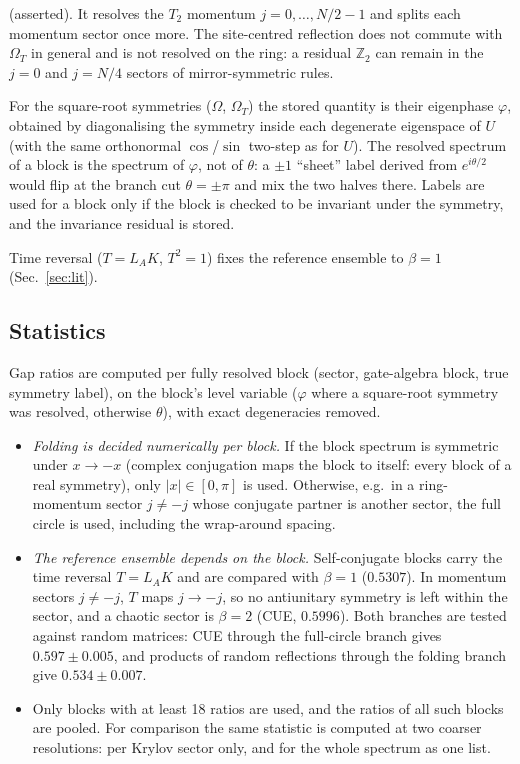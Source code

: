 \begin{enumerate}
\begin{itemize}
    (asserted). It resolves the $T_2$ momentum $j=0,\ldots,N/2-1$ and splits each momentum sector once more. The
    site-centred reflection does not commute with $\Omega_T$ in general and is not resolved on the ring: a residual
    $\mathbb{Z}_2$ can remain in the $j=0$ and $j=N/4$ sectors of mirror-symmetric rules.
  \end{itemize}
  For the square-root symmetries ($\Omega$, $\Omega_T$) the stored quantity is their eigenphase $\varphi$, obtained by
  diagonalising the symmetry inside each degenerate eigenspace of $U$ (with the same orthonormal $\cos$/$\sin$
  two-step as for $U$). The resolved spectrum of a block is the spectrum of $\varphi$, not of $\theta$: a $\pm1$
  ``sheet'' label derived from $e^{i\theta/2}$ would flip at the branch cut $\theta=\pm\pi$ and mix the two halves
  there. Labels are used for a block only if the block is checked to be invariant under the symmetry, and the invariance
  residual is stored.
\end{enumerate}
Time reversal ($T=L_AK$, $T^2=1$) fixes the reference ensemble to $\beta=1$
(Sec.~\ref{sec:lit}).

\subsection{Statistics}
Gap ratios are computed per fully resolved block (sector, gate-algebra block, true symmetry label), on the block's level
variable ($\varphi$ where a square-root symmetry was resolved, otherwise $\theta$), with exact degeneracies removed.
\begin{itemize}
\item \emph{Folding is decided numerically per block.} If the block spectrum is symmetric under $x\to-x$ (complex
  conjugation maps the block to itself: every block of a real symmetry), only $|x|\in[0,\pi]$ is used. Otherwise, e.g.\
  in a ring-momentum sector $j\ne-j$ whose conjugate partner is another sector, the full circle is used, including the
  wrap-around spacing.
\item \emph{The reference ensemble depends on the block.} Self-conjugate blocks carry the time reversal $T=L_AK$ and are
  compared with $\beta=1$ ($0.5307$). In momentum sectors $j\ne-j$, $T$ maps $j\to-j$, so no antiunitary symmetry is
  left within the sector, and a chaotic sector is $\beta=2$ (CUE, $0.5996$). Both branches are tested against random
  matrices: CUE through the full-circle branch gives $0.597\pm0.005$, and products of random reflections through the
  folding branch give $0.534\pm0.007$.
\item Only blocks with at least 18 ratios are used, and the ratios of all such blocks are pooled. For comparison the
  same statistic is computed at two coarser resolutions: per Krylov sector only, and for the whole spectrum as one list.
\end{itemize}

